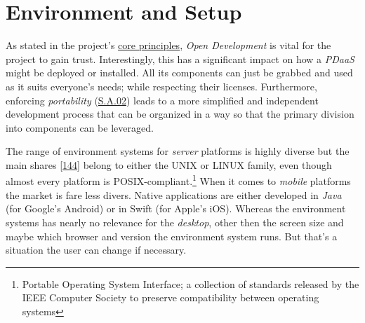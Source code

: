 \documentclass[12pt,english,a4paper,titlepage,cleardoublepage=empty,dottedtoc]{report}
\begin{document}
\section{Environment and Setup}\label{environment-and-setup}

As stated in the project's \protect\hyperlink{core-principles}{core
principles}, \emph{Open Development} is vital for the project to gain
trust. Interestingly, this has a significant impact on how a
\emph{PDaaS} might be deployed or installed. All its components can just
be grabbed and used as it suits everyone's needs; while respecting their
licenses. Furthermore, enforcing \emph{portability}
(\protect\hyperlink{sa02}{S.A.02}) leads to a more simplified and
independent development process that can be organized in a way so that
the primary division into components can be leveraged.

The range of environment systems for \emph{server} platforms is highly
diverse but the main shares
{[}\protect\hyperlink{ref-web_2017_wikipedia_os-market-share}{144}{]}
belong to either the UNIX or LINUX family, even though almost every
platform is POSIX-compliant.\footnote{Portable Operating System
  Interface; a collection of standards released by the IEEE Computer
  Society to preserve compatibility between operating systems} When it
comes to \emph{mobile} platforms the market is fare less divers. Native
applications are either developed in \emph{Java} (for Google's Android)
or in Swift (for Apple's iOS). Whereas the environment systems has
nearly no relevance for the \emph{desktop}, other then the screen size
and maybe which browser and version the environment system runs. But
that's a situation the user can change if necessary.
\end{document}
